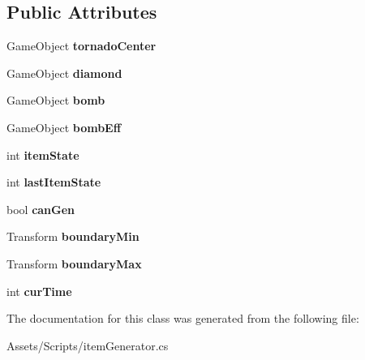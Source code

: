 \subsection*{Public Attributes}
\begin{DoxyCompactItemize}
\item 
Game\+Object {\bfseries tornado\+Center}\hypertarget{classitem_generator_a7a3c094dee2b917d489a462cc369561b}{}\label{classitem_generator_a7a3c094dee2b917d489a462cc369561b}

\item 
Game\+Object {\bfseries diamond}\hypertarget{classitem_generator_a9f986797e5ee5769207ddd26bda3cb6c}{}\label{classitem_generator_a9f986797e5ee5769207ddd26bda3cb6c}

\item 
Game\+Object {\bfseries bomb}\hypertarget{classitem_generator_a2b3fb9d879b486ba187d0782d6224b6e}{}\label{classitem_generator_a2b3fb9d879b486ba187d0782d6224b6e}

\item 
Game\+Object {\bfseries bomb\+Eff}\hypertarget{classitem_generator_aaef3d099074fb65ee61af63f142b681a}{}\label{classitem_generator_aaef3d099074fb65ee61af63f142b681a}

\item 
int {\bfseries item\+State}\hypertarget{classitem_generator_a555ee98b3fe7bb9fb5f4b792a2e565d1}{}\label{classitem_generator_a555ee98b3fe7bb9fb5f4b792a2e565d1}

\item 
int {\bfseries last\+Item\+State}\hypertarget{classitem_generator_a7440dfca610aa0d703f9dd0cd1cd100b}{}\label{classitem_generator_a7440dfca610aa0d703f9dd0cd1cd100b}

\item 
bool {\bfseries can\+Gen}\hypertarget{classitem_generator_a9a661debb6aee81ce1113303186a89c2}{}\label{classitem_generator_a9a661debb6aee81ce1113303186a89c2}

\item 
Transform {\bfseries boundary\+Min}\hypertarget{classitem_generator_af6dadcb6f3ee6e9d5574bfa9d617e3e3}{}\label{classitem_generator_af6dadcb6f3ee6e9d5574bfa9d617e3e3}

\item 
Transform {\bfseries boundary\+Max}\hypertarget{classitem_generator_ad96cb8762c2211a57a6e7b8efbba842d}{}\label{classitem_generator_ad96cb8762c2211a57a6e7b8efbba842d}

\item 
int {\bfseries cur\+Time}\hypertarget{classitem_generator_a99af826d033d9f04dc4c5cdd788fe964}{}\label{classitem_generator_a99af826d033d9f04dc4c5cdd788fe964}

\end{DoxyCompactItemize}


The documentation for this class was generated from the following file\+:\begin{DoxyCompactItemize}
\item 
Assets/\+Scripts/item\+Generator.\+cs\end{DoxyCompactItemize}
